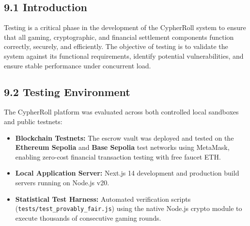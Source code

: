 \vspace{1.0cm}
\par
\label{chap:testing}
\vspace{0.15cm}
\par
\vspace{0.3cm}

\subsection*{9.1 Introduction}
Testing is a critical phase in the development of the CypherRoll system to ensure that all gaming, cryptographic, and financial settlement components function correctly, securely, and efficiently. The objective of testing is to validate the system against its functional requirements, identify potential vulnerabilities, and ensure stable performance under concurrent load.

\subsection*{9.2 Testing Environment}
The CypherRoll platform was evaluated across both controlled local sandboxes and public testnets:
\begin{itemize}[leftmargin=1.5em]
    \item \textbf{Blockchain Testnets:} The escrow vault was deployed and tested on the \textbf{Ethereum Sepolia} and \textbf{Base Sepolia} test networks using MetaMask, enabling zero-cost financial transaction testing with free faucet ETH.
    \item \textbf{Local Application Server:} Next.js 14 development and production build servers running on Node.js v20.
    \item \textbf{Statistical Test Harness:} Automated verification scripts (\texttt{tests/test\_provably\_fair.js}) using the native Node.js crypto module to execute thousands of consecutive gaming rounds.
\end{itemize}


